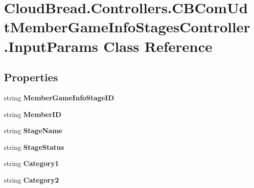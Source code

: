 \hypertarget{a00106}{}\section{Cloud\+Bread.\+Controllers.\+C\+B\+Com\+Udt\+Member\+Game\+Info\+Stages\+Controller.\+Input\+Params Class Reference}
\label{a00106}
\subsection*{Properties}
\begin{DoxyCompactItemize}
\item 
string {\bfseries Member\+Game\+Info\+Stage\+ID}\hypertarget{a00106_a8a343ffa4ea91e4c3aaf883654851938}{}\label{a00106_a8a343ffa4ea91e4c3aaf883654851938}

\item 
string {\bfseries Member\+ID}\hypertarget{a00106_a69c5c74193164b75d404109fc59635ff}{}\label{a00106_a69c5c74193164b75d404109fc59635ff}

\item 
string {\bfseries Stage\+Name}\hypertarget{a00106_a992b5a965dd9cc81461238fa91ea4c80}{}\label{a00106_a992b5a965dd9cc81461238fa91ea4c80}

\item 
string {\bfseries Stage\+Status}\hypertarget{a00106_a245de45264b32fb25b485ad0c84cbe91}{}\label{a00106_a245de45264b32fb25b485ad0c84cbe91}

\item 
string {\bfseries Category1}\hypertarget{a00106_a1e1a0da1af97656da23214ac04e9e4a2}{}\label{a00106_a1e1a0da1af97656da23214ac04e9e4a2}

\item 
string {\bfseries Category2}\hypertarget{a00106_a2cd9ad22c97c58b569761c7e805933e2}{}\label{a00106_a2cd9ad22c97c58b569761c7e805933e2}


\end{DoxyCompactItemize}

